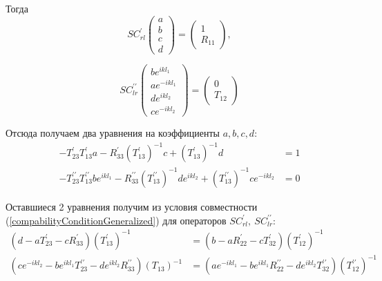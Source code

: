 \documentclass[a4 paper, 12 pt]{extarticle}
\begin{document}
   Тогда
   \begin{equation}
   \label{generalizedBoundaryCond1}
   SC_{rl}^\prime\left(
   \begin{array}{c}
   a \\
   b \\
   c \\
   d
   \end{array}\right) = \left(\begin{array}{c}
   1 \\
   R_{11}
   \end{array}\right),
   \end{equation}
   
   \begin{equation}
   \label{generalizedBoundaryCond2}
   SC_{lr}^{\prime\prime}\left(
   \begin{array}{c}
   b e^{ikl_1} \\
   a e^{-ikl_1}\\
   d e^{ikl_2}\\
   c e^{-ikl_2}
   \end{array}\right) = \left(\begin{array}{c}
   0 \\
   T_{12}
   \end{array}\right)   
   \end{equation}
   
   Отсюда получаем два уравнения на коэффициенты $a, b, c, d$:
   \[
   \begin{aligned}
   -T_{23}^\prime T_{13}^\prime a - R_{33}^\prime \left(T_{13}^\prime\right)^{-1}c + \left(T_{13}^\prime\right)^{-1}d &= 1 \\
   -T_{23}^{\prime\prime} T_{13}^{\prime\prime} b e^{ikl_1} - R_{33}^{\prime\prime} \left(T_{13}^{\prime\prime}\right)^{-1}d e^{ikl_2} + \left(T_{13}^{\prime\prime}\right)^{-1}c e^{-ikl_2} &= 0
   \end{aligned}\]
   
   Оставшиеся 2 уравнения получим из условия совместности (\ref{compabilityConditionGeneralized}) для операторов $SC_{rl}^\prime, \ SC_{lr}^{\prime\prime}$:
   \[
   \begin{aligned}
   \left(d-aT_{23}^\prime -cR_{33}^\prime\right)\left(T_{13}^\prime\right)^{-1} &= \left(b-aR_{22}^\prime -c T_{32}^\prime\right)\left(T_{12}^\prime\right)^{-1} \\
   \left(c e^{-ikl_2}-b e^{ikl_1} T_{23}^{\prime\prime}-d e^{ikl_2}R_{33}^{\prime\prime}\right)\left(T_{13}\right)^{-1} &= \left(a e^{-ikl_1} - b e^{ikl_1} R_{22}^{\prime\prime} -d e^{ikl_2} T_{32}^{\prime\prime}\right)\left(T_{12}^{\prime\prime}\right)^{-1}
   \end{aligned}
   \]
   
\end{document}

